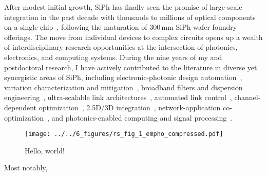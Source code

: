 After modest initial growth, SiPh has finally seen the promise of large-scale integration in the past decade with thousands to millions of optical components on a single chip~\cite{shekharRoadmappingNextGeneration2024}, following the maturation of 300\,mm SiPh-wafer foundry offerings. The move from individual devices to complex circuits opens up a wealth of interdisciplinary research opportunities at the intersection of photonics, electronics, and computing systems. During the nine years of my \myDegree{} and postdoctoral research, I have actively contributed to the literature in diverse yet synergistic areas of SiPh, including electronic-photonic design automation~\cite{wuCompactModelingCircuitlevel2017,zhangCompactModelingSilicon2017,jamesFlexibleProcessAwareCompact2022,jamesProcessVariationAwareCompact2023a}, variation characterization and mitigation~\cite{wuPairingMicroringbasedSilicon2018,wangEnergyefficientChannelAlignment2018,wangTamingEmergingDevices2019,wangBidirectionalTuningMicroringbased2019,wangCharacterizationApplicationsSpatial2020,wangEnergyEfficiencyYield2021}, broadband filters and dispersion engineering~\cite{wangDispersionEngineeredFabricationRobustSOI2023,wangIntegratedCompactTunable2023,parsonsOFC25}, ultra-scalable link architectures~\cite{wangScalableArchitectureSubpJ2023,novickHighbandwidthDensitySilicon2023}, automated link control~\cite{wangAutomatedTuningRingAssisted2024,wangInterleaverTuning,wangOFC25}, channel-dependent optimization~\cite{novickIntegratedPhotonicResonant2024,gopalEqualization2024}, 2.5D/3D integration~\cite{wangSiliconPhotonicsChip2024,wangCoDesignedSiliconPhotonics2024,RovinskiISCAS25}, network-application co-optimization~\cite{wangTaskMappingAssistedLaser2019,wangTrafficAdaptivePowerReconfiguration2021,michelogiannakisEfficientIntraRackResource2023,wuWavelengthReconfigurableTransceiver2024,wuFlexibleSiliconPhotonic2024}, and photonics-enabled computing and signal processing~\cite{naumanOFC25,zypmanDSP}.


\begin{wrapfigure}{r}{0.4\textwidth}
    \begin{center}
        \texttt{[image: ../../6\_figures/rs\_fig\_1\_empho\_compressed.pdf]}
    \end{center}
    \caption{Hello, world!}
\end{wrapfigure}

Most notably,

\kant[1-6]